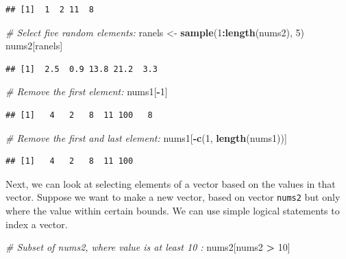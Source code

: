 \documentclass[]{book}
\newenvironment{Shaded}{\begin{snugshade}}{\end{snugshade}}
\newcommand{\CommentTok}[1]{\textcolor[rgb]{0.56,0.35,0.01}{\textit{#1}}}
\newcommand{\DecValTok}[1]{\textcolor[rgb]{0.00,0.00,0.81}{#1}}
\newcommand{\KeywordTok}[1]{\textcolor[rgb]{0.13,0.29,0.53}{\textbf{#1}}}
\newcommand{\NormalTok}[1]{#1}
\newcommand{\OperatorTok}[1]{\textcolor[rgb]{0.81,0.36,0.00}{\textbf{#1}}}
\newcommand{\StringTok}[1]{\textcolor[rgb]{0.31,0.60,0.02}{#1}}
\begin{document}
\begin{verbatim}
## [1]  1  2 11  8
\end{verbatim}

\begin{Shaded}
\begin{Highlighting}[]
\CommentTok{# Select five random elements:}
\NormalTok{ranels <-}\StringTok{ }\KeywordTok{sample}\NormalTok{(}\DecValTok{1}\OperatorTok{:}\KeywordTok{length}\NormalTok{(nums2), }\DecValTok{5}\NormalTok{)}
\NormalTok{nums2[ranels]}
\end{Highlighting}
\end{Shaded}

\begin{verbatim}
## [1]  2.5  0.9 13.8 21.2  3.3
\end{verbatim}

\begin{Shaded}
\begin{Highlighting}[]
\CommentTok{# Remove the first element:}
\NormalTok{nums1[}\OperatorTok{-}\DecValTok{1}\NormalTok{]}
\end{Highlighting}
\end{Shaded}

\begin{verbatim}
## [1]   4   2   8  11 100   8
\end{verbatim}

\begin{Shaded}
\begin{Highlighting}[]
\CommentTok{# Remove the first and last element:}
\NormalTok{nums1[}\OperatorTok{-}\KeywordTok{c}\NormalTok{(}\DecValTok{1}\NormalTok{, }\KeywordTok{length}\NormalTok{(nums1))]}
\end{Highlighting}
\end{Shaded}

\begin{verbatim}
## [1]   4   2   8  11 100
\end{verbatim}

Next, we can look at selecting elements of a vector based on the values in that vector. Suppose we want to make a new vector, based on vector \texttt{nums2} but only where the value within certain bounds. We can use simple logical statements to index a vector.

\begin{Shaded}
\begin{Highlighting}[]
\CommentTok{# Subset of nums2, where value is at least 10 :}
\NormalTok{nums2[nums2 }\OperatorTok{>}\StringTok{ }\DecValTok{10}\NormalTok{]}
\end{Highlighting}
\end{Shaded}
\end{document}
